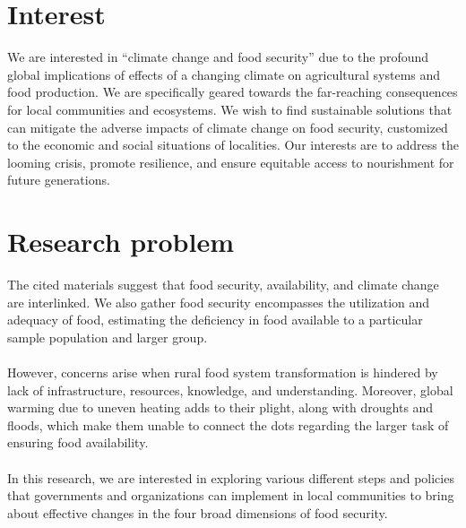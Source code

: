 \documentclass[12pt, twoside]{report}
\begin{document}
\begin{multicols}{2}
\section*{Interest}
We are interested in ``climate change and food security'' due to the profound global implications of effects of a changing climate on agricultural systems and food production. We are specifically geared towards the far-reaching consequences for local communities and ecosystems. We wish to find sustainable solutions that can mitigate the adverse impacts of climate change on food security, customized to the economic and social situations of localities. Our interests are to address the looming crisis, promote resilience, and ensure equitable access to nourishment for future generations.


\section*{Research problem}
The cited materials suggest that food security, availability, and climate change are interlinked. We also gather food security encompasses the utilization and adequacy of food, estimating the deficiency in food available to a particular sample population and larger group. \\ \\ 
However, concerns arise when rural food system transformation is hindered by lack of infrastructure, resources, knowledge, and understanding. Moreover, global warming due to uneven heating adds to their plight, along with droughts and floods, which make them unable to connect the dots regarding the larger task of ensuring food availability. \\ \\
In this research, we are interested in exploring various different steps and policies that governments and organizations can implement in local communities to bring about effective changes in the four broad dimensions of food security.



\end{multicols}
\end{document}
